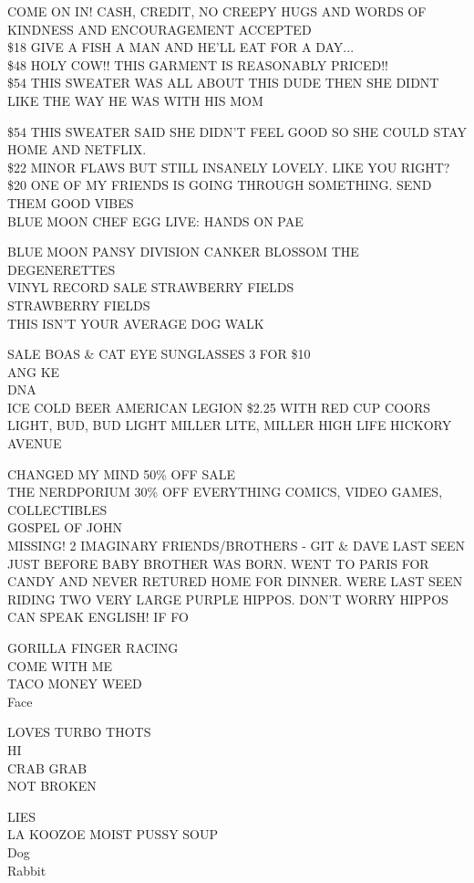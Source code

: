 \documentclass[10pt,letterpaper]{article}
\begin{document}
COME ON IN!  CASH, CREDIT, NO CREEPY HUGS AND WORDS OF KINDNESS AND ENCOURAGEMENT ACCEPTED\\
\$18 GIVE A FISH A MAN AND HE'LL EAT FOR A DAY...\\
\$48 HOLY COW!! THIS GARMENT IS REASONABLY PRICED!!\\
\$54 THIS SWEATER WAS ALL ABOUT THIS DUDE THEN SHE DIDNT LIKE THE WAY HE WAS WITH HIS MOM

\$54 THIS SWEATER SAID SHE DIDN'T FEEL GOOD SO SHE COULD STAY HOME AND NETFLIX.\\
\$22 MINOR FLAWS BUT STILL INSANELY LOVELY.  LIKE YOU RIGHT?\\
\$20 ONE OF MY FRIENDS IS GOING THROUGH SOMETHING.  SEND THEM GOOD VIBES\\
BLUE MOON CHEF EGG LIVE: HANDS ON PAE

BLUE MOON PANSY DIVISION CANKER BLOSSOM THE DEGENERETTES\\
VINYL RECORD SALE STRAWBERRY FIELDS\\
STRAWBERRY FIELDS\\
THIS ISN'T YOUR AVERAGE DOG WALK

SALE BOAS \& CAT EYE SUNGLASSES 3 FOR \$10\\
ANG KE\\
DNA\\
ICE COLD BEER AMERICAN LEGION \$2.25 WITH RED CUP COORS LIGHT, BUD, BUD LIGHT MILLER LITE, MILLER HIGH LIFE HICKORY AVENUE

CHANGED MY MIND 50\% OFF SALE\\
THE NERDPORIUM 30\% OFF EVERYTHING COMICS, VIDEO GAMES, COLLECTIBLES\\
GOSPEL OF JOHN\\
MISSING!  2 IMAGINARY FRIENDS/BROTHERS {-} GIT \& DAVE LAST SEEN JUST BEFORE BABY BROTHER WAS BORN.  WENT TO PARIS FOR CANDY AND NEVER RETURED HOME FOR DINNER.  WERE LAST SEEN RIDING TWO VERY LARGE PURPLE HIPPOS.  DON'T WORRY HIPPOS CAN SPEAK ENGLISH!  IF FO

GORILLA FINGER RACING\\
COME WITH ME\\
TACO MONEY WEED\\
Face

LOVES TURBO THOTS\\
HI\\
CRAB GRAB\\
NOT BROKEN

LIES\\
LA KOOZOE MOIST PUSSY SOUP\\
Dog\\
Rabbit
\end{document}
